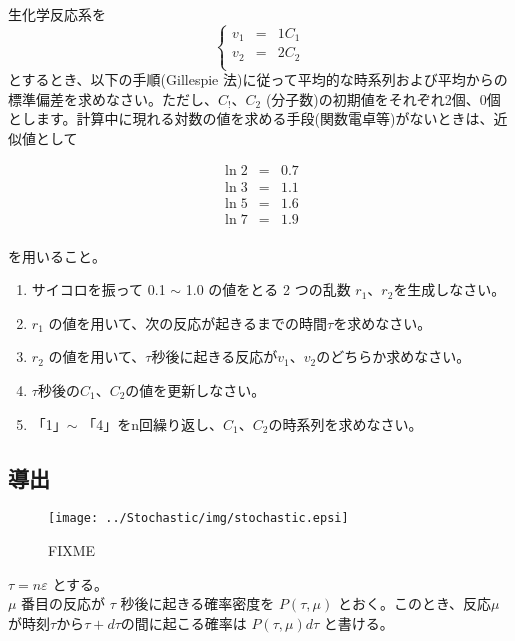 生化学反応系を
\[\left\{
\begin{array}{lcl}
v_1 & = & 1 C_1 \\ 
v_2 & = & 2 C_2 \\ 
\end{array}
\right.\]
とするとき、以下の手順(Gillespie 法)に従って平均的な時系列および平均からの標準偏差を求めなさい。ただし、\(C_!\)、\(C_2\) (分子数)の初期値をそれぞれ2個、0個とします。計算中に現れる対数の値を求める手段(関数電卓等)がないときは、近似値として

\begin{eqnarray*}
\ln 2 & = & 0.7 \\
\ln 3 & = & 1.1 \\
\ln 5 & = & 1.6 \\
\ln 7 & = & 1.9 \\
\end{eqnarray*}

を用いること。

\begin{enumerate}
\item サイコロを振って 0.1 \(\sim\) 1.0 の値をとる 2 つの乱数 \(r_1\)、\(r_2\)を生成しなさい。
\item \(r_1\) の値を用いて、次の反応が起きるまでの時間\(\tau\)を求めなさい。
\item \(r_2\) の値を用いて、\(\tau\)秒後に起きる反応が\(v_1\)、\(v_2\)のどちらか求めなさい。
\item \(\tau\)秒後の\(C_1\)、\(C_2\)の値を更新しなさい。
\item 「1」\(\sim\) 「4」をn回繰り返し、\(C_1\)、\(C_2\)の時系列を求めなさい。

\end{enumerate}


\subsection{導出}
\begin{figure}[ht]
\centering
\texttt{[image: ../Stochastic/img/stochastic.epsi]}
\caption{FIXME}
\label{fig:stochastic1}
\end{figure}

$ \tau = n \varepsilon $ とする。\\

$\mu$ 番目の反応が $ \tau $ 秒後に起きる確率密度を $ P(\tau,\mu) $ とおく。このとき、反応$\mu$が時刻$\tau$から$\tau+d\tau$の間に起こる確率は $ P(\tau,\mu) d\tau $ と書ける。

